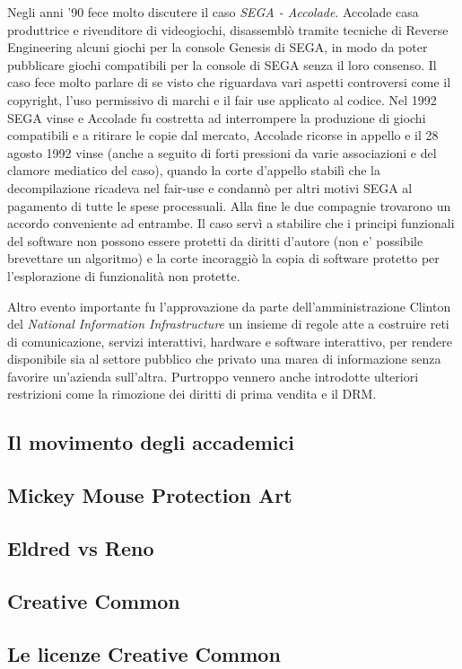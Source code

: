 Negli anni '90 fece molto discutere il caso \textit{SEGA - Accolade}. Accolade casa produttrice e rivenditore di videogiochi, disassemblò tramite tecniche di Reverse Engineering alcuni giochi per la console Genesis di SEGA, in modo da poter pubblicare giochi compatibili per la console di SEGA senza il loro consenso. Il caso fece molto parlare di se visto che riguardava vari aspetti controversi come il copyright, l'uso permissivo di marchi e il fair use applicato al codice.
Nel 1992 SEGA vinse e Accolade fu costretta ad interrompere la produzione di giochi compatibili e a ritirare le copie dal mercato, Accolade ricorse in appello e il 28 agosto 1992 vinse (anche a seguito di forti pressioni da varie associazioni e del clamore mediatico del caso), quando la corte d'appello stabilì che la decompilazione ricadeva nel fair-use e condannò per altri motivi SEGA al pagamento di tutte le spese processuali. Alla fine le due compagnie trovarono un accordo conveniente ad entrambe. Il caso servì a stabilire che i principi funzionali del software non possono essere protetti da diritti d'autore (non e' possibile brevettare un algoritmo) e la corte incoraggiò la copia di software protetto per l'esplorazione di funzionalità non protette.

Altro evento importante fu l'approvazione da parte dell'amministrazione Clinton del \textit{National Information Infrastructure} un insieme di regole atte a costruire reti di comunicazione, servizi interattivi, hardware e software interattivo, per rendere disponibile sia al settore pubblico che privato una marea di informazione senza favorire un'azienda sull'altra. Purtroppo vennero anche introdotte ulteriori restrizioni come la rimozione dei diritti di prima vendita e il DRM.

\subsection{Il movimento degli accademici}

\subsection{Mickey Mouse Protection Art}

\subsection{Eldred vs Reno}

\subsection{Creative Common}

\subsection{Le licenze Creative Common}